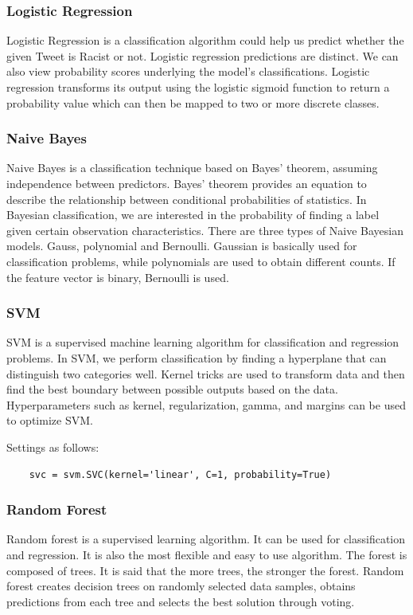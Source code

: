 \documentclass{article}
\begin{document}
\subsubsection{Logistic Regression}

Logistic Regression is a classification algorithm could help us predict whether the given Tweet is Racist or not. Logistic regression predictions are distinct. We can also view probability scores underlying the model's classifications. Logistic regression transforms its output using the logistic sigmoid function to return a probability value which can then be mapped to two or more discrete classes. 

\subsubsection{Naive Bayes}

Naive Bayes is a classification technique based on Bayes' theorem, assuming independence between predictors. Bayes' theorem provides an equation to describe the relationship between conditional probabilities of statistics. In Bayesian classification, we are interested in the probability of finding a label given certain observation characteristics. There are three types of Naive Bayesian models. Gauss, polynomial and Bernoulli. Gaussian is basically used for classification problems, while polynomials are used to obtain different counts. If the feature vector is binary, Bernoulli is used.

\subsubsection{SVM}

SVM is a supervised machine learning algorithm for classification and regression problems. In SVM, we perform classification by finding a hyperplane that can distinguish two categories well. Kernel tricks are used to transform data and then find the best boundary between possible outputs based on the data. Hyperparameters such as kernel, regularization, gamma, and margins can be used to optimize SVM.

Settings as follows:

\begin{lstlisting}
    svc = svm.SVC(kernel='linear', C=1, probability=True)
\end{lstlisting}

\subsubsection{Random Forest}
Random forest is a supervised learning algorithm. It can be used for classification and regression. It is also the most flexible and easy to use algorithm. The forest is composed of trees. It is said that the more trees, the stronger the forest. Random forest creates decision trees on randomly selected data samples, obtains predictions from each tree and selects the best solution through voting.
\end{document}
